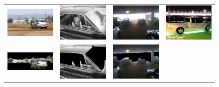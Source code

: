 \documentclass[10pt,twocolumn,letterpaper]{article}
\begin{document}
\begin{figure}[p]
\centering
\begin{tabular}{ p{4cm} p{4cm} p{4cm} p{4cm} }
\includegraphics[width=3.95cm]{figures/results/2008_000052.jpg.eps} &
\includegraphics[width=3.95cm]{figures/results/2008_000828.jpg.eps} &
\includegraphics[width=3.95cm]{figures/results/2008_000952.jpg.eps} &
\includegraphics[width=3.95cm]{figures/results/2008_002198.jpg.eps} \\
\includegraphics[width=3.95cm]{figures/results/a2008_000052.jpg.eps} &
\includegraphics[width=3.95cm]{figures/results/a2008_000828.jpg.eps} &
\includegraphics[width=3.95cm]{figures/results/a2008_000952.jpg.eps} &

\end{tabular}
\end{figure}
\end{document}
